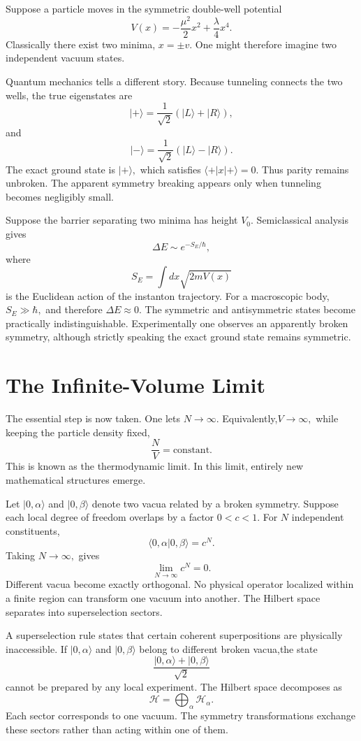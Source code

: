 Suppose a particle moves in the symmetric double-well potential
\[V(x)=-\frac{\mu^2}{2}x^2+\frac{\lambda}{4}x^4.\]
Classically there exist two minima, $x=\pm v.$
One might therefore imagine two independent vacuum states.

Quantum mechanics tells a different story.
Because tunneling connects the two wells,
the true eigenstates are
\[|+\rangle=\frac{1}{\sqrt2}\left(|L\rangle+|R\rangle\right),\]
and
\[|-\rangle=\frac{1}{\sqrt2}\left(|L\rangle-|R\rangle\right).\]
The exact ground state is $|+\rangle,$ which satisfies 
$\langle +|x|+\rangle=0.$
Thus parity remains unbroken.
The apparent symmetry breaking appears only when tunneling becomes
negligibly small.

Suppose the barrier separating two minima has height $V_0.$
Semiclassical analysis gives 
\[\Delta E \sim e^{-S_E/\hbar},\]
where
\[S_E=\int dx \sqrt{2mV(x)}\]
is the Euclidean action of the instanton trajectory.
For a macroscopic body,$ S_E \gg \hbar,$ and therefore
$ \Delta E \approx 0.$
The symmetric and antisymmetric states become practically
indistinguishable.
Experimentally one observes an apparently broken symmetry, although
strictly speaking the exact ground state remains symmetric.

\section{The Infinite-Volume Limit}
The essential step is now taken.
One lets $N \rightarrow \infty.$
Equivalently,$V \rightarrow \infty,$
while keeping the particle density fixed,
\[\frac {N}{V}=\text{constant}.\]
This is known as the thermodynamic limit.
In this limit,
entirely new mathematical structures emerge.

Let $|0,\alpha\rangle $ and $|0,\beta\rangle$ 
denote two vacua related by a broken symmetry.
Suppose each local degree of freedom overlaps by a factor $0<c<1.$
For $N$ independent constituents,
\[\langle 0,\alpha|0,\beta\rangle=c^N.\]
Taking $N\rightarrow\infty,$ gives
\[\boxed{\lim_{N\rightarrow\infty}c^N=0.}\]
Different vacua become exactly orthogonal.
No physical operator localized within a finite region can transform one
vacuum into another.
The Hilbert space separates into superselection sectors.

A superselection rule states that certain coherent superpositions are
physically inaccessible.
If $|0,\alpha\rangle $ and $|0,\beta\rangle$ belong to different broken
vacua,the state
\[\frac{|0,\alpha\rangle+|0,\beta\rangle}{\sqrt2}\]
cannot be prepared by any local experiment.
The Hilbert space decomposes as
\[\boxed{\mathcal H=\bigoplus_\alpha \mathcal H_\alpha .}\]
Each sector corresponds to one vacuum.
The symmetry transformations exchange these sectors rather than acting
within one of them.

